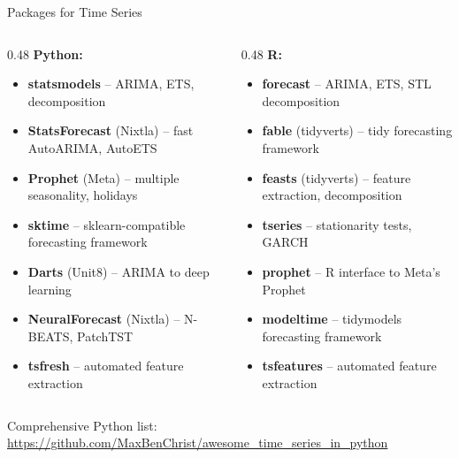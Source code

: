 \documentclass[11pt,compress,t,notes=noshow, xcolor=table]{beamer}
\begin{document}
\begin{vbframe}{Packages for Time Series}
\vfill
\footnotesize
\begin{columns}[T]
\begin{column}{0.48\textwidth}
\textbf{Python:}
\begin{itemize}\setlength{\itemsep}{1pt}
    \item \textbf{statsmodels} -- ARIMA, ETS, decomposition
    \item \textbf{StatsForecast} (Nixtla) -- fast AutoARIMA, AutoETS
    \item \textbf{Prophet} (Meta) -- multiple seasonality, holidays
    \item \textbf{sktime} -- sklearn-compatible forecasting framework
    \item \textbf{Darts} (Unit8) -- ARIMA to deep learning
    \item \textbf{NeuralForecast} (Nixtla) -- N-BEATS, PatchTST
    \item \textbf{tsfresh} -- automated feature extraction
\end{itemize}
\end{column}
\begin{column}{0.48\textwidth}
\textbf{R:}
\begin{itemize}\setlength{\itemsep}{1pt}
    \item \textbf{forecast} -- ARIMA, ETS, STL decomposition
    \item \textbf{fable} (tidyverts) -- tidy forecasting framework
    \item \textbf{feasts} (tidyverts) -- feature extraction, decomposition
    \item \textbf{tseries} -- stationarity tests, GARCH
    \item \textbf{prophet} -- R interface to Meta's Prophet
    \item \textbf{modeltime} -- tidymodels forecasting framework
    \item \textbf{tsfeatures} -- automated feature extraction
\end{itemize}
\end{column}
\end{columns}
\vfill
Comprehensive Python list: \url{https://github.com/MaxBenChrist/awesome_time_series_in_python}
\vfill
\end{vbframe}


\endlecture
\end{document}

